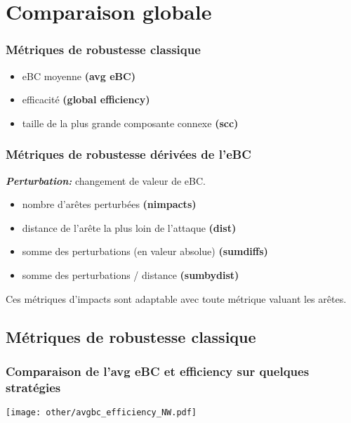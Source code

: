 \documentclass[aspectratio=169]{beamer}
\begin{document}
    \section{Comparaison globale}

    \begin{frame}
        \frametitle{Métriques de robustesse classique}
        \begin{itemize}
            \item eBC moyenne \textbf{(avg eBC)}
            \vspace{20pt}
            \item efficacité \textbf{(global efficiency)}
            \vspace{20pt}
            \item taille de la plus grande composante connexe \textbf{(scc)}
        \end{itemize}
    \end{frame}

    \begin{frame}
        \frametitle{Métriques de robustesse dérivées de l'eBC}
        \textbf{\textit{Perturbation:}} changement de valeur de eBC.
        \begin{itemize}
            \item nombre d'arêtes perturbées \textbf{(nimpacts)}
            \vspace{5pt}
            \item distance de l'arête la plus loin de l'attaque \textbf{(dist)}
            \vspace{5pt}
            \item somme des perturbations (en valeur absolue) \textbf{(sumdiffs)}
            \vspace{5pt}
            \item somme des perturbations / distance \textbf{(sumbydist)}
        \end{itemize}
        \vspace{10pt}
        Ces métriques d'impacts sont adaptable avec toute métrique valuant les arêtes.
    \end{frame}

    \subsection{Métriques de robustesse classique}
    
    \begin{frame}
        \frametitle{Comparaison de l'avg eBC et efficiency sur quelques stratégies}
        \centering
        \texttt{[image: other/avgbc\_efficiency\_NW.pdf]}
    \end{frame}
\end{document}
